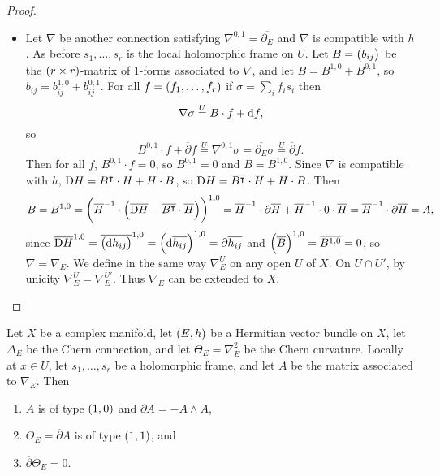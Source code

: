\begin{proof}
\begin{itemize}
\item Let $ \nabla $ be another connection satisfying $ \nabla^{0, 1} = \overline{\partial_E} $ and $ \nabla $ is compatible with $ h $. As before $ s_1, \dots, s_r $ is the local holomorphic frame on $ U $. Let $ B = \br{b_{ij}} $ be the $ \br{r \times r} $-matrix of $ 1 $-forms associated to $ \nabla $, and let $ B = B^{1, 0} + B^{0, 1} $, so $ b_{ij} = b_{ij}^{1, 0} + b_{ij}^{0, 1} $. For all $ f = \br{f_1, \dots, f_r} $ if $ \sigma = \sum_i f_is_i $ then
$$ \nabla\sigma \overset{U}{=} B \cdot f + \mathrm{d} f, $$
so
$$ B^{0, 1} \cdot f + \overline{\partial}f \overset{U}{=} \nabla^{0, 1}\sigma = \overline{\partial_E}\sigma \overset{U}{=} \overline{\partial}f. $$
Then for all $ f $, $ B^{0, 1} \cdot f = 0 $, so $ B^{0, 1} = 0 $ and $ B = B^{1, 0} $. Since $ \nabla $ is compatible with $ h $, $ \mathrm{D} H = B^\intercal \cdot H + H \cdot \overline{B} $, so $ \overline{\mathrm{D} H} = \overline{B^\intercal} \cdot \overline{H} + \overline{H} \cdot B $. Then
$$ B = B^{1, 0} = \br{\overline{H}^{-1} \cdot \br{\overline{\D H} - \overline{B^\intercal} \cdot \overline{H}}}^{1, 0} = \overline{H}^{-1} \cdot \partial\overline{H} + \overline{H}^{-1} \cdot 0 \cdot \overline{H} = \overline{H}^{-1} \cdot \partial\overline{H} = A, $$
since $ \overline{\D H}^{1, 0} = \overline{\br{\d h_{ij}}}^{1, 0} = \br{\d \overline{h_{ij}}}^{1, 0} = \partial\overline{h_{ij}} $ and $ \br{\overline{B}}^{1, 0} = \overline{B^{1, 0}} = 0 $, so $ \nabla = \nabla_E $. We define in the same way $ \nabla_E^U $ on any open $ U $ of $ X $. On $ U \cap U' $, by unicity $ \nabla_E^U = \nabla_E^{U'} $. Thus $ \nabla_E $ can be extended to $ X $.
\end{itemize}
\end{proof}

\begin{corollary}
Let $ X $ be a complex manifold, let $ \br{E, h} $ be a Hermitian vector bundle on $ X $, let $ \Delta_E $ be the Chern connection, and let $ \Theta_E = \nabla_E^2 $ be the Chern curvature. Locally at $ x \in U $, let $ s_1, \dots, s_r $ be a holomorphic frame, and let $ A $ be the matrix associated to $ \nabla_E $. Then
\begin{enumerate}
\item $ A $ is of type $ \br{1, 0} $ and $ \partial A = -A \wedge A $,
\item $ \Theta_E = \overline{\partial}A $ is of type $ \br{1, 1} $, and
\item $ \overline{\partial}\Theta_E = 0 $.
\end{enumerate}
\end{corollary}

